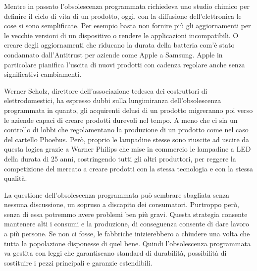 \documentclass[12pt]{book} %
\begin{document}
\begin{mdframed}[linewidth=1pt]
Mentre in passato l'obsolescenza programmata richiedeva uno studio chimico per definire il ciclo di
vita di un prodotto, oggi, con la diffusione dell'elettronica le cose si sono semplificate. Per
esempio basta non fornire più gli aggiornamenti per le vecchie versioni di un dispositivo o rendere le applicazioni
incompatibili. O creare degli aggiornamenti che riducano la durata della batteria com'è stato
condannato dall'Antitrust per aziende come Apple a Samsung. Apple in particolare pianifica l'uscita di nuovi prodotti con cadenza regolare anche senza significativi cambiamenti. 

Werner Scholz, direttore dell'associazione tedesca dei costruttori di elettrodomestici, ha espresso dubbi sulla
lungimiranza dell'obsolescenza programmata in quanto, gli acquirenti delusi di un prodotto migreranno poi verso le
aziende capaci di creare prodotti durevoli nel tempo. A meno che ci sia un controllo di lobbi che regolamentano la
produzione di un prodotto come nel caso del cartello Phoebus. Però, proprio le lampadine stesse sono riuscite ad uscire
da questa logica grazie a Warner Philips che mise in commercio le lampadine a LED della durata di 25 anni, costringendo
tutti gli altri produttori, per reggere la competizione del mercato a creare prodotti con la stessa tecnologia e con la
stessa qualità.

La questione dell'obsolescenza programmata può sembrare sbagliata senza nessuna discussione, un
sopruso a discapito dei consumatori. Purtroppo però, senza di essa potremmo avere problemi ben più gravi. Questa strategia
consente mantenere alti i consumi e la produzione, di conseguenza consente di dare lavoro a più persone. Se non ci
fosse, le fabbriche inizierebbero a chiudere una volta che tutta la popolazione disponesse di quel bene. 
Quindi l'obsolescenza programmata va gestita con leggi che garantiscano standard di durabilità, possibilità di
sostituire i pezzi principali e garanzie estendibili.
\end{mdframed}
\end{document}
